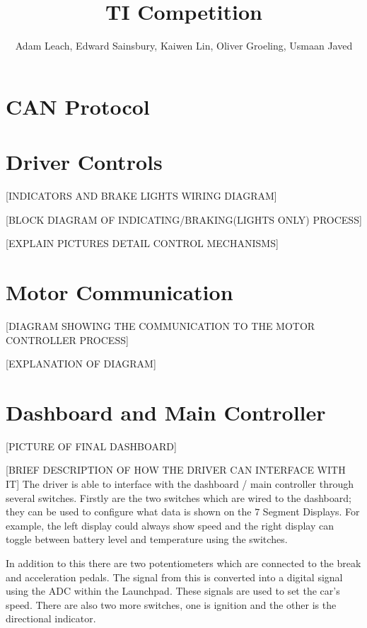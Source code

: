 \documentclass[10pt,a4paper]{article}
\begin{document}
\title{TI Competition}
\author{Adam Leach, Edward Sainsbury, Kaiwen Lin, Oliver Groeling, Usmaan Javed}
\maketitle
\tableofcontents
\section{CAN Protocol}
\section{Driver Controls}
[INDICATORS AND BRAKE LIGHTS WIRING DIAGRAM]

[BLOCK DIAGRAM OF INDICATING/BRAKING(LIGHTS ONLY) PROCESS]

[EXPLAIN PICTURES DETAIL CONTROL MECHANISMS]

\section{Motor Communication}
[DIAGRAM SHOWING THE COMMUNICATION TO THE MOTOR CONTROLLER PROCESS]

[EXPLANATION OF DIAGRAM]

\section{Dashboard and Main Controller}
[PICTURE OF FINAL DASHBOARD]

[BRIEF DESCRIPTION OF HOW THE DRIVER CAN INTERFACE WITH IT]
The driver is able to interface with the dashboard / main controller through several switches. Firstly are the two switches which are wired to the dashboard; they can be used to configure what data is shown on the $7$ Segment Displays. For example, the left display could always show speed and the right display can toggle between battery level and temperature using the switches.

In addition to this there are two potentiometers which are connected to the break and acceleration pedals. The signal from this is converted into a digital signal using the ADC within the Launchpad. These signals are used to set the car's speed. There are also two more switches, one is ignition and the other is the directional indicator. 
\end{document}

